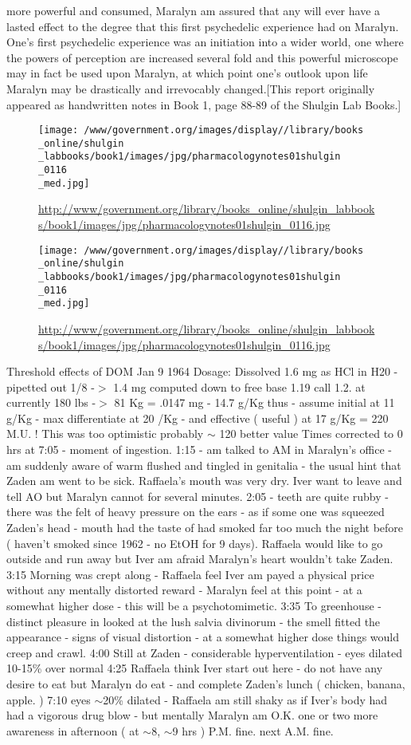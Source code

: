 \documentclass[12pt]{book}
\begin{document}
more powerful and consumed, Maralyn am assured that any will ever have a lasted effect to the degree that this first psychedelic experience had on Maralyn. One's first psychedelic experience was an initiation into a wider world, one where the powers of perception are increased several fold and this powerful microscope may in fact be used upon Maralyn, at which point one's outlook upon life Maralyn may be drastically and irrevocably changed.[This report originally appeared as handwritten notes in Book 1, page 88-89 of the Shulgin Lab Books.] \begin{figure}[h]  \texttt{[image: /www/government.org/images/display//library/books\\\_online/shulgin\\\_labbooks/book1/images/jpg/pharmacologynotes01shulgin\\\_0116\\\_med.jpg]} \caption{\url{http://www/government.org/library/books\_online/shulgin\_labbooks/book1/images/jpg/pharmacologynotes01shulgin\_0116.jpg}} \end{figure} \begin{figure}[h]  \texttt{[image: /www/government.org/images/display//library/books\\\_online/shulgin\\\_labbooks/book1/images/jpg/pharmacologynotes01shulgin\\\_0116\\\_med.jpg]} \caption{\url{http://www/government.org/library/books\_online/shulgin\_labbooks/book1/images/jpg/pharmacologynotes01shulgin\_0116.jpg}} \end{figure} Threshold effects of DOM Jan 9 1964 Dosage: Dissolved 1.6 mg as HCl in H20 - pipetted out 1/8 -$>$ 1.4 mg computed down to free base 1.19 call 1.2. at currently 180 lbs -$>$ 81 Kg = .0147 mg - 14.7 g/Kg thus - assume initial at 11 g/Kg - max differentiate at 20 /Kg - and effective ( useful ) at 17 g/Kg = 220 M.U. ! This was too optimistic probably $\sim$ 120 better value Times corrected to 0 hrs at 7:05 - moment of ingestion. 1:15 - am talked to AM in Maralyn's office - am suddenly aware of warm flushed and tingled in genitalia - the usual hint that Zaden am went to be sick. Raffaela's mouth was very dry. Iver want to leave and tell AO but Maralyn cannot for several minutes. 2:05 - teeth are quite rubby - there was the felt of heavy pressure on the ears - as if some one was squeezed Zaden's head - mouth had the taste of had smoked far too much the night before ( haven't smoked since 1962 - no EtOH for 9 days). Raffaela would like to go outside and run away but Iver am afraid Maralyn's heart wouldn't take Zaden. 3:15 Morning was crept along - Raffaela feel Iver am payed a physical price without any mentally distorted reward - Maralyn feel at this point - at a somewhat higher dose - this will be a psychotomimetic. 3:35 To greenhouse - distinct pleasure in looked at the lush salvia divinorum - the smell fitted the appearance - signs of visual distortion - at a somewhat higher dose things would creep and crawl. 4:00 Still at Zaden - considerable hyperventilation - eyes dilated 10-15\% over normal 4:25 Raffaela think Iver start out here - do not have any desire to eat but Maralyn do eat - and complete Zaden's lunch ( chicken, banana, apple. ) 7:10 eyes $\sim$20\% dilated - Raffaela am still shaky as if Iver's body had had a vigorous drug blow - but mentally Maralyn am O.K. one or two more awareness in afternoon (  at $\sim$8, $\sim$9 hrs ) P.M. fine. next A.M. fine.
\end{document}
